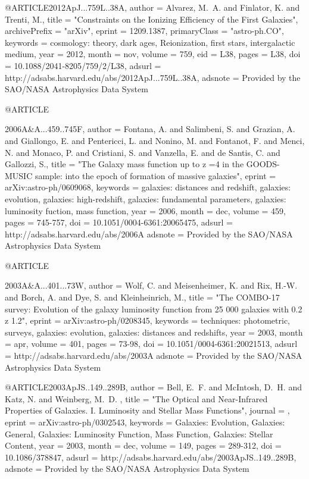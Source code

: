 \documentclass{article}
\begin{document}
@ARTICLE{2012ApJ...759L..38A,
   author = {{Alvarez}, M.~A. and {Finlator}, K. and {Trenti}, M.},
    title = "{Constraints on the Ionizing Efficiency of the First Galaxies}",
archivePrefix = "arXiv",
   eprint = {1209.1387},
 primaryClass = "astro-ph.CO",
 keywords = {cosmology: theory, dark ages, Reionization, first stars, intergalactic medium},
     year = 2012,
    month = nov,
   volume = 759,
      eid = {L38},
    pages = {L38},
      doi = {10.1088/2041-8205/759/2/L38},
   adsurl = {http://adsabs.harvard.edu/abs/2012ApJ...759L..38A},
  adsnote = {Provided by the SAO/NASA Astrophysics Data System}
}  

@ARTICLE{2006A&A...459..745F,
   author = {{Fontana}, A. and {Salimbeni}, S. and {Grazian}, A. and {Giallongo}, E. and 
	{Pentericci}, L. and {Nonino}, M. and {Fontanot}, F. and {Menci}, N. and 
	{Monaco}, P. and {Cristiani}, S. and {Vanzella}, E. and {de Santis}, C. and 
	{Gallozzi}, S.},
    title = "{The Galaxy mass function up to z =4 in the GOODS-MUSIC sample: into the epoch of formation of massive galaxies}",
   eprint = {arXiv:astro-ph/0609068},
 keywords = {galaxies: distances and redshift, galaxies: evolution, galaxies: high-redshift, galaxies: fundamental parameters, galaxies: luminosity fuction, mass function},
     year = 2006,
    month = dec,
   volume = 459,
    pages = {745-757},
      doi = {10.1051/0004-6361:20065475},
   adsurl = {http://adsabs.harvard.edu/abs/2006A%
  adsnote = {Provided by the SAO/NASA Astrophysics Data System}
}

@ARTICLE{2003A&A...401...73W,
   author = {{Wolf}, C. and {Meisenheimer}, K. and {Rix}, H.-W. and {Borch}, A. and 
	{Dye}, S. and {Kleinheinrich}, M.},
    title = "{The COMBO-17 survey: Evolution of the galaxy luminosity function from 25 000 galaxies with 0.2{\lt} z {\lt}1.2}",
   eprint = {arXiv:astro-ph/0208345},
 keywords = {techniques: photometric, surveys, galaxies: evolution, galaxies: distances and redshifts},
     year = 2003,
    month = apr,
   volume = 401,
    pages = {73-98},
      doi = {10.1051/0004-6361:20021513},
   adsurl = {http://adsabs.harvard.edu/abs/2003A%
  adsnote = {Provided by the SAO/NASA Astrophysics Data System}
}

@ARTICLE{2003ApJS..149..289B,
   author = {{Bell}, E.~F. and {McIntosh}, D.~H. and {Katz}, N. and {Weinberg}, M.~D.
	},
    title = "{The Optical and Near-Infrared Properties of Galaxies. I. Luminosity and Stellar Mass Functions}",
  journal = {\apjs},
   eprint = {arXiv:astro-ph/0302543},
 keywords = {Galaxies: Evolution, Galaxies: General, Galaxies: Luminosity Function, Mass Function, Galaxies: Stellar Content},
     year = 2003,
    month = dec,
   volume = 149,
    pages = {289-312},
      doi = {10.1086/378847},
   adsurl = {http://adsabs.harvard.edu/abs/2003ApJS..149..289B},
  adsnote = {Provided by the SAO/NASA Astrophysics Data System}
}

}}
\end{document}
